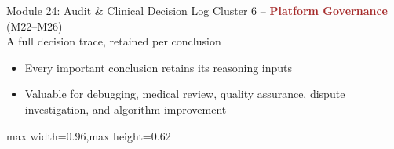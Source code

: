 \documentclass[9pt,aspectratio=169]{beamer}
\begin{document}
\begin{frame}[t]{Module 24: Audit \& Clinical Decision Log}
\textcolor{black!55}{\scriptsize Cluster 6 -- \textcolor{brown}{\textbf{Platform Governance}} (M22--M26) \\ A full decision trace, retained per conclusion}\\[2pt]
\begin{itemize}
\scriptsize
\item Every important conclusion retains its reasoning inputs
\item Valuable for debugging, medical review, quality assurance, dispute investigation, and algorithm improvement
\end{itemize}
\vspace{4pt}
\begin{center}
\begin{adjustbox}{max width=0.96\linewidth,max height=0.62\textheight}
\end{adjustbox}
\end{center}
\end{frame}
\end{document}
